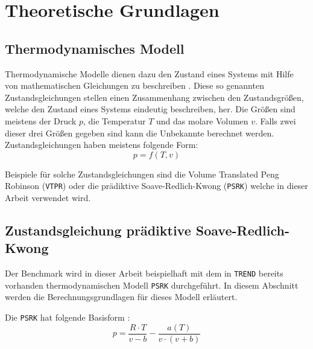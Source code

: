 \documentclass[../thesis.tex]{subfiles}
\begin{document}
	
\makeatletter %
\makeatother

\chapter{Theoretische Grundlagen}
\label{chp: grundlagen}

\section{Thermodynamisches Modell}

Thermodynamische Modelle dienen dazu den Zustand eines Systems mit Hilfe von mathematischen Gleichungen zu beschreiben \cite{atkins2006atkins}. Diese so genannten Zustandsgleichungen stellen einen Zusammenhang zwischen den Zustandsgrößen, welche den Zustand eines Systems eindeutig beschreiben, her. Die Größen sind meistens der Druck $p$, die Temperatur $T$ und das molare Volumen $v$. Falls zwei dieser drei Größen gegeben sind kann die Unbekannte berechnet werden. Zustandsgleichungen haben meistens folgende Form:
\begin{equation}
	p = f(T,v)
\end{equation}

Beispiele für solche Zustandsgleichungen sind die Volume Translated Peng Robinson (\texttt{VTPR}) \cite{ahlers2002development} oder die prädiktive Soave-Redlich-Kwong (\texttt{PSRK}) \cite{HOLDERBAUM1991251} welche in dieser Arbeit verwendet wird.

\section{Zustandsgleichung prädiktive Soave-Redlich-Kwong}

Der Benchmark wird in dieser Arbeit beispielhaft mit dem in \texttt{TREND} bereits vorhanden thermodynamischen Modell \texttt{PSRK} durchgeführt. In diesem Abschnitt werden die Berechnungsgrundlagen für dieses Modell erläutert.

Die \texttt{PSRK} hat folgende Basisform \cite{HOLDERBAUM1991251}:
\begin{equation}
	p = \dfrac{R \cdot T}{v - b}- \dfrac{a(T)}{v \cdot (v + b)}
\end{equation}
\end{document}
